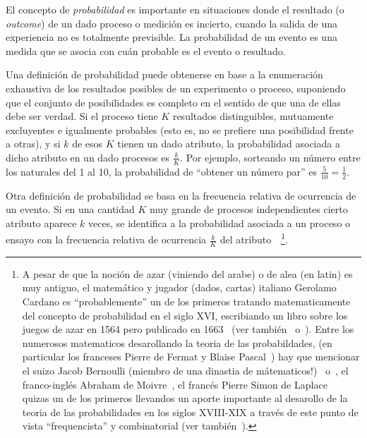 \label{Sec:MP:Probabilidad}

El  concepto  de  {\it  probabilidad}  es importante  en  situaciones  donde  el
resultado (o {\it outcome}) de un  dado proceso o medici\'on es incierto, cuando
la salida de una experiencia no  es totalmente previsible. La probabilidad de un
evento es una medida que se asocia con cu\'an probable es el evento o resultado.

Una  definici\'on de  probabilidad puede  obtenerse en  base a  la enumeraci\'on
exhaustiva de los resultados posibles de un experimento o proceso,
suponiendo que el conjunto de posibilidades es completo en el sentido de que una
de  ellas debe ser  verdad. Si  el proceso  tiene $K$  resultados distinguibles,
mutuamente  excluyentes e  igualmente probables  (esto  es, no  se prefiere  una
posibilidad frente a  otras), y si $k$  de esos $K$ tienen un  dado atributo, la
probabilidad asociada a dicho atributo en un dado procesos es $\frac{k}{K}$. Por
ejemplo, sorteando un n\'umero entre los  naturales del 1 al 10, la probabilidad
de ``obtener un n\'umero par'' es $\frac5{10} = \frac12$.

Otra  definici\'on  de  probabilidad  se  basa  en  la  frecuencia  relativa  de
ocurrencia  de  un evento.   Si  en  una cantidad  $K$  muy  grande de  procesos
independientes  cierto   atributo  aparece  $k$   veces,  se  identifica   a  la
probabilidad  asociada a  un  proceso o  ensayo  con la  frecuencia relativa  de
ocurrencia    $\frac{k}{K}$    del    atributo~\cite[\&   Ref.]{Bra76,    Hal90,
  ShaVov06}~\footnote{A pesar de que la  noci\'on de azar (viniendo del arabe) o
  de alea (en  latin) es muy antiguo, el matem\'atico  y jugador (dados, cartas)
  italiano  Gerolamo Cardano es  ``probablemente'' un  de los  primeros tratando
  matematicamente del concepto  de probabilidad en el siglo  XVI, escribiando un
  libro sobre  los juegos  de azar en  1564 pero publicado  en 1663~\cite{Car63}
  (ver  tambi\'en~\cite{Bel05}  o~\cite[Cap.~4]{Hal90}).   Entre  los  numerosos
  matematicos desarollando  la teoria de  las probabildades, (en  particular los
  franceses  Pierre  de Fermat  y  Blaise  Pascal~\cite[Cap.~5]{Hal90}) hay  que
  mencionar   el   suizo  Jacob   Bernoulli   (miembro   de   una  dinastia   de
  m\'atematicos!)~\cite[en      latin]{Ber1713}      o~\cite{Ber1713:2},      el
  franco-ingl\'es Abraham  de Moivre~\cite{Dem56}, el franc\'es  Pierre Simon de
  Laplace~\cite{Lap20} quizas un de  los primeros llevandos un aporte importante
  al desarollo  de la  teoria de  las probabilidades en  los siglos  XVIII-XIX a
  trav\'es  de  este  punto  de  vista  ``frequencista''  y  combinatorial  (ver
  tambi\'en~\cite[Cap.~13, 15 \&~22]{Hal90}).}.

